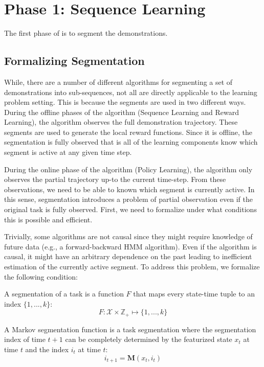 \section{Phase 1: Sequence Learning}
The first phase of \hirl is to segment the demonstrations.

\subsection{Formalizing Segmentation}
While, there are a number of different algorithms for segmenting a set of demonstrations into sub-sequences, not all are directly applicable to the learning problem setting.
This is because the segments are used in two different ways. During the offline phases of the algorithm (Sequence Learning and Reward Learning), the algorithm observes the full demonstration trajectory.
These segments are used to generate the local reward functions.
Since it is offline, the segmentation is fully observed that is all of the learning components know which segment is active at any given time step.

During the online phase of the algorithm (Policy Learning), the algorithm only observes the partial trajectory up-to the current time-step.
From these observations, we need to be able to known which segment is currently active.
In this sense, segmentation introduces a problem of partial observation even if the original task is fully observed.
First, we need to formalize under what conditions this is possible and efficient.

Trivially, some algorithms are not causal since they might require knowledge of future data (e.g., a forward-backward HMM algorithm).
Even if the algorithm is causal, it might have an arbitrary dependence on the past leading to inefficient estimation of the currently active segment.
To address this problem, we formalize the following condition:

\begin{definition}[Segmentation]
A segmentation of a task is a function $F$ that maps every state-time tuple to an index $\{1,...,k\}$:
\[
F: \mathcal{X} \times \mathbb{Z}_+ \mapsto \{1,...,k\}
\]

A Markov segmentation function is a task segmentation where the segmentation index of time $t+1$ can be completely determined by the featurized state $x_t$ at time $t$ and the index $i_t$ at time $t$:
\[
i_{t+1} = \mathbf{M}(x_t, i_t)  
\]
\end{definition}

